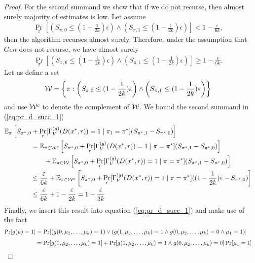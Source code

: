 \begin{proof}
For the second summand we show that if we do not recurse, then almost surely majority of estimates is low.
Let assume
\begin{align}
\underset{\pi}{\Pr}\left[\left(S_{\pi,0} \leq (1 - \frac{1}{2k})\epsilon\right) \land \left( S_{\pi,1} \leq (1-\frac{1}{2k})\epsilon\right)\right] < 1 - \frac{\epsilon}{6k},
\end{align}
then the algorithm recurses almost surely.
Therefore, under the assumption that $Gen$ does not recurse, we have almost surely
\begin{align}
\underset{\pi}{\Pr}\left[\left(S_{\pi,0} \leq (1 - \frac{1}{2k})\epsilon\right) \land \left( S_{\pi,1} \leq (1-\frac{1}{2k})\epsilon\right)\right] \geq 1 - \frac{\epsilon}{6k}.
\end{align}
Let us define a set
\begin{align}
  \mathcal{W} = \left\{ \pi :  \left(S_{\pi,0} \leq (1 - \frac{1}{2k})\varepsilon\right) \land \left( S_{\pi,1} \leq (1-\frac{1}{2k})\varepsilon \right) \right\}
\end{align}
and use $\mathcal{W}^c$ to denote the complement of $\mathcal{W}$.
We bound the second summand in (\ref{eq:pr_d_succ_1})
\begin{align}
&\mathbb{E}_{\pi}\left[ S_{\pi^*,0} + \Pr_r [\Gamma_V^{(g)}(D(x^*,r)) = 1 \mid \pi_1 = \pi^*](S_{\pi^*,1} - S_{\pi^*,0}) \right] \notag\\
&\mbox\qquad\qquad = \mathbb{E}_{\pi \in \mathcal{W}^c}\left[ S_{\pi^*,0} + \Pr_r [\Gamma_V^{(g)}(D(x^*,r)) = 1 \mid \pi = \pi^*](S_{\pi^*,1} - S_{\pi^*,0}) \right] \notag\\
&\mbox\qquad\qquad\qquad +  \mathbb{E}_{\pi \in \mathcal{W}}\left[ S_{\pi^*,0} + \Pr_r [\Gamma_V^{(g)}(D(x^*,r)) = 1 \mid \pi = \pi^*](S_{\pi^*,1} - S_{\pi^*,0}) \right] \\
&\mbox\qquad\qquad \leq \frac{\varepsilon}{6k} + \mathbb{E}_{\pi \in \mathcal{W}^c}\left[ S_{\pi^*,0} + \Pr_r [\Gamma_V^{(g)}(D(x^*,r)) = 1 \mid \pi = \pi^*]((1 - \frac{1}{2k})\varepsilon - S_{\pi^*,0}) \right] \\
&\mbox\qquad\qquad \leq \frac{\varepsilon}{6k} + 1 - \frac{\varepsilon}{2k} = 1 - \frac{\varepsilon}{3k}
\end{align}
Finally, we insert this result into equation (\ref{eq:pr_d_succ_1}) and make use of the fact
\begin{align*}
\underset{}{\Pr}[g(u) = 1] &= \underset{}{\Pr}[(g(0, \mu_2, \dots, \mu_k) = 1) \lor ( g(1,\mu_2, \dots, \mu_k) = 1 \land g(0, \mu_2, \dots, \mu_k) = 0 \land \mu_1 = 1)] \notag\\
&= \Pr[g(0,\mu_2, \dots,\mu_k) = 1] + \Pr[g(1,\mu_2,\dots,\mu_k) = 1 \land g(0, \mu_2, \dots, \mu_k) = 0] \Pr[\mu_1 = 1]

\end{align*}
\end{proof}
